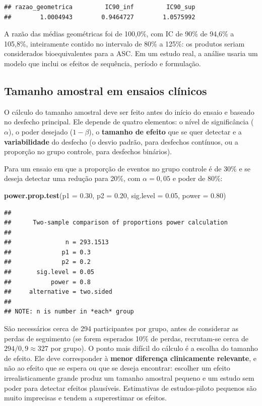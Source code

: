 \documentclass[
]{book}
\newenvironment{Shaded}{\begin{snugshade}}{\end{snugshade}}
\newcommand{\AttributeTok}[1]{\textcolor[rgb]{0.13,0.29,0.53}{#1}}
\newcommand{\FloatTok}[1]{\textcolor[rgb]{0.00,0.00,0.81}{#1}}
\newcommand{\FunctionTok}[1]{\textcolor[rgb]{0.13,0.29,0.53}{\textbf{#1}}}
\newcommand{\NormalTok}[1]{#1}
\begin{document}
\begin{verbatim}
## razao_geometrica         IC90_inf         IC90_sup 
##        1.0004943        0.9464727        1.0575992
\end{verbatim}

A razão das médias geométricas foi de 100,0\%, com IC de 90\% de 94,6\% a 105,8\%, inteiramente contido no intervalo de 80\% a 125\%: os produtos seriam considerados bioequivalentes para a ASC. Em um estudo real, a análise usaria um modelo que inclui os efeitos de sequência, período e formulação.

\subsection{Tamanho amostral em ensaios clínicos}\label{tamanho-amostral-em-ensaios-cluxednicos}

O cálculo do tamanho amostral deve ser feito antes do início do ensaio e baseado no desfecho principal. Ele depende de quatro elementos: o nível de significância (\(\alpha\)), o poder desejado (\(1 - \beta\)), o \textbf{tamanho de efeito} que se quer detectar e a \textbf{variabilidade} do desfecho (o desvio padrão, para desfechos contínuos, ou a proporção no grupo controle, para desfechos binários).

Para um ensaio em que a proporção de eventos no grupo controle é de 30\% e se deseja detectar uma redução para 20\%, com \(\alpha = 0{,}05\) e poder de 80\%:

\begin{Shaded}
\begin{Highlighting}[]
\FunctionTok{power.prop.test}\NormalTok{(}\AttributeTok{p1 =} \FloatTok{0.30}\NormalTok{, }\AttributeTok{p2 =} \FloatTok{0.20}\NormalTok{, }\AttributeTok{sig.level =} \FloatTok{0.05}\NormalTok{, }\AttributeTok{power =} \FloatTok{0.80}\NormalTok{)}
\end{Highlighting}
\end{Shaded}

\begin{verbatim}
## 
##      Two-sample comparison of proportions power calculation 
## 
##               n = 293.1513
##              p1 = 0.3
##              p2 = 0.2
##       sig.level = 0.05
##           power = 0.8
##     alternative = two.sided
## 
## NOTE: n is number in *each* group
\end{verbatim}

São necessários cerca de 294 participantes por grupo, antes de considerar as perdas de seguimento (se forem esperados 10\% de perdas, recrutam-se cerca de \(294/0{,}9 \approx 327\) por grupo). O ponto mais difícil do cálculo é a escolha do tamanho de efeito. Ele deve corresponder à \textbf{menor diferença clinicamente relevante}, e não ao efeito que se espera ou que se deseja encontrar: escolher um efeito irrealisticamente grande produz um tamanho amostral pequeno e um estudo sem poder para detectar efeitos plausíveis. Estimativas de estudos-piloto pequenos são muito imprecisas e tendem a superestimar os efeitos.
\end{document}
